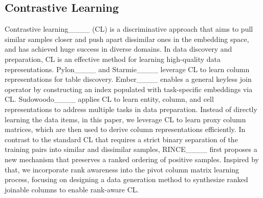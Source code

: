 \subsection{Contrastive Learning}
Contrastive learning____ (CL) is a discriminative approach that aims to pull similar samples closer and push apart dissimilar ones in the embedding space, and has achieved huge success in diverse domains.
In data discovery and preparation, CL is an effective method for learning high-quality data representations. Pylon____ and Starmie____ leverage CL to learn column representations for table discovery. Ember____  enables a general keyless join operator by constructing an index populated with task-specific embeddings via CL. Sudowoodo____ applies CL to learn entity, column, and cell representations to address multiple tasks in data preparation. Instead of directly learning the data items, in this paper, we leverage CL to learn proxy column matrices, which are then used to derive column representations efficiently. In contrast to the standard CL that requires a strict binary separation of the training pairs into similar and dissimilar samples, RINCE____ first proposes a new mechanism that preserves a ranked ordering of positive samples. Inspired by that, we incorporate rank awareness into the pivot column matrix learning process, focusing on designing a data generation method to synthesize ranked joinable columns to enable rank-aware CL.